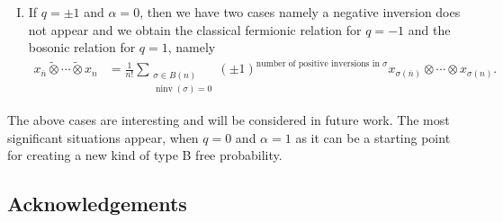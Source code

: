 \documentclass[pdftex]{sigma}
\numberwithin{equation}{section}
\newcommand{\q}{q}
\newcommand{\s}{\alpha}%
\begin{document}
\begin{Remark}
\begin{enumerate}[(I)]
If $\q=0$ and $\alpha=\pm1$, then $P_{\alpha,0}^{(n)}=1+\alpha\pi_0$ and $\frac{1}{2} \tilde P_{\alpha,0}^{(n)}$ is a projection. From this we see that
\begin{enumerate}\itemsep=0pt
\item if $\q=0$ and $\s= -1$, then we don't have a positive inversion and at most one negative inversion $\pi_0$ and so we obtain
\begin{align*}
x_{\overline n}\tilde \otimes\cdots \tilde \otimes x_{n}={}& \frac{1}{2}x_{\overline n} \otimes \cdots \otimes x_{\bar 1} \otimes x_{ 1} \otimes \dots \otimes x_{n}
\\ &-\frac{1}{2}x_{\overline n} \otimes \cdots \otimes x_{ 1} \otimes x_{\bar 1}\otimes \dots \otimes x_{n} .
\end{align*}
This tensor product might be called the \emph{Boolean tensor product of type B};
\item if $\q=0$ and $\s= 1$, then we obtain the \emph{free tensor product of type B}
\begin{align*}
x_{\overline n}\tilde \otimes\cdots \tilde \otimes x_{n}={}& \frac{1}{2}x_{\overline n} \otimes \cdots \otimes x_{\bar 1} \otimes x_{ 1} \otimes \dots \otimes x_{n}
\\ &+\frac{1}{2}x_{\overline n} \otimes \cdots \otimes x_{ 1} \otimes x_{\bar 1}\otimes \dots \otimes x_{n}.
\end{align*}
\end{enumerate}

\item If $\q=\pm 1$ and $\s= 0$, then we have two cases namely a negative inversion does not appear and we obtain the classical fermionic relation for $q=-1$ and the bosonic relation for $q=1$, namely
\begin{align*}
x_{\overline n}\tilde \otimes\cdots \tilde \otimes x_{n}&=\frac{1}{n!}\sum_{\substack{ \sigma \in B(n) \\ \operatorname{ninv}(\sigma)=0 }} (\pm 1)^{\text{number of positive inversions in }\sigma}
x_{\sigma(\overline n)} \otimes \cdots \otimes x_{\sigma(n)}.
\end{align*}
\end{enumerate}
\end{Remark}
The above cases are interesting and will be considered in future work. The most significant situations appear, when $\q=0$ and $\s= 1$ as it can be a starting point for creating a new kind of type B free probability.


\subsection*{Acknowledgements}
	
\end{document}
